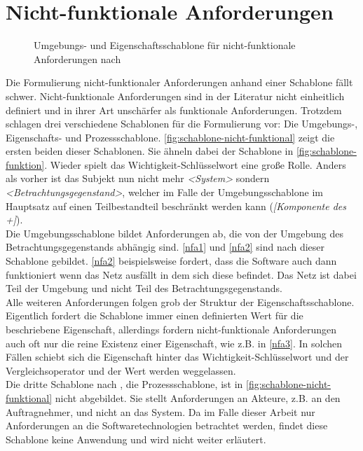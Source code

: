 \section{Nicht-funktionale Anforderungen}
\label{sec:nicht-funktionale}

\begin{figure}
    \centering
    
    
    \caption{Umgebungs- und Eigenschaftsschablone für nicht-funktionale Anforderungen nach }
    \label{fig:schablone-nicht-funktional}
\end{figure}

Die Formulierung nicht-funktionaler Anforderungen anhand einer Schablone fällt schwer. Nicht-funktionale
Anforderungen sind in der Literatur nicht einheitlich definiert und in ihrer Art unschärfer als funktionale
Anforderungen. Trotzdem schlagen  drei verschiedene Schablonen für die Formulierung
vor: Die Umgebungs-, Eigenschafts- und Prozessschablone. \autoref{fig:schablone-nicht-funktional} zeigt
die ersten beiden dieser Schablonen. Sie ähneln dabei der Schablone in \autoref{fig:schablone-funktion}.
Wieder spielt das Wichtigkeit-Schlüsselwort eine große Rolle. Anders als vorher ist das Subjekt nun 
nicht mehr \emph{<System>} sondern \emph{<Betrachtungsgegenstand>}, welcher im Falle der Umgebungsschablone
im Hauptsatz auf einen Teilbestandteil beschränkt werden kann (\emph{[Komponente des +]}).\\

Die Umgebungsschablone bildet Anforderungen ab, die von der Umgebung 
des Betrachtungsgegenstands abhängig sind. \ref{nfa1} und \ref{nfa2} sind nach dieser Schablone gebildet.
\ref{nfa2} beispielsweise fordert, dass die Software auch dann funktioniert wenn das Netz ausfällt in dem 
sich diese befindet. Das Netz ist dabei Teil der Umgebung und nicht Teil des Betrachtungsgegenstands.\\
Alle weiteren Anforderungen folgen grob der Struktur der Eigenschaftsschablone. Eigentlich fordert die 
Schablone immer einen definierten Wert für die beschriebene Eigenschaft, allerdings fordern nicht-funktionale
Anforderungen auch oft nur die reine Existenz einer Eigenschaft, wie z.B. in \ref{nfa3}.
In solchen Fällen schiebt sich die Eigenschaft hinter das 
Wichtigkeit-Schlüsselwort und der Vergleichsoperator und der Wert werden weggelassen.\\
Die dritte Schablone nach , die Prozessschablone, ist in \autoref{fig:schablone-nicht-funktional}
nicht abgebildet. Sie stellt Anforderungen an Akteure, z.B. an den Auftragnehmer, und nicht an das System.
Da im Falle dieser Arbeit nur Anforderungen an die Softwaretechnologien betrachtet werden, findet diese Schablone 
keine Anwendung und wird nicht weiter erläutert. 

